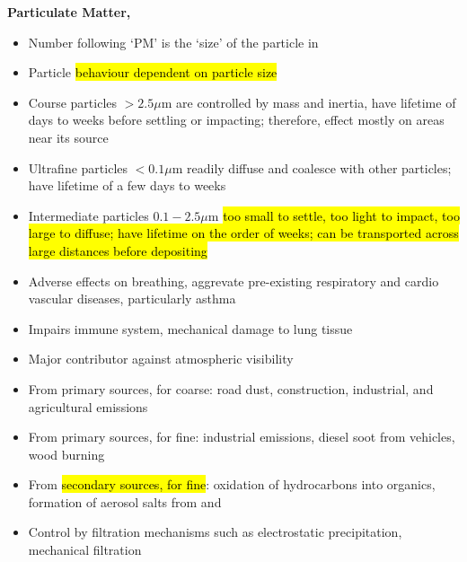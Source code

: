 \documentclass{article}
\newcommand{\headingsmall}[1]{{\small\textbf{#1}}}
\begin{document}
\begin{multicols*}{4}
\headingsmall{Particulate Matter, }
\begin{itemize} \itemsep -0.5em
    \item Number following `PM' is the `size' of the particle in 
    \item Particle \hl{behaviour dependent on particle size}
    \item Course particles $> 2.5 \mu \mathrm{m}$ are controlled by mass and
        inertia, have lifetime of days to weeks before settling or impacting; 
        therefore, effect mostly on areas near its source
    \item Ultrafine particles $< 0.1 \mu \mathrm{m}$ readily diffuse and coalesce
        with other particles; have lifetime of a few days to weeks
    \item Intermediate particles $0.1 - 2.5 \mu \mathrm{m}$ \hl{too small to settle,
        too light to impact, too large to diffuse; have lifetime on the order of
        weeks; can be transported across large distances before depositing}
    \item Adverse effects on breathing, aggrevate pre-existing respiratory and
        cardio vascular diseases, particularly asthma
    \item Impairs immune system, mechanical damage to lung tissue
    \item Major contributor against atmospheric visibility
    \item From primary sources, for coarse: road dust, construction, industrial,
        and agricultural emissions
    \item From primary sources, for fine: industrial emissions, diesel soot from
        vehicles, wood burning
    \item From \hl{secondary sources, for fine}: oxidation of hydrocarbons into
        organics, formation of aerosol salts from  and 
    \item Control by filtration mechanisms such as electrostatic precipitation,
        mechanical filtration
\end{itemize}


\end{multicols*}
\end{document}
